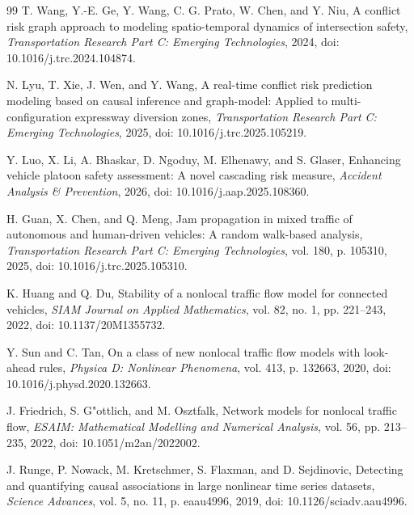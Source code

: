 \documentclass[UTF8,zihao=5,a4paper]{ctexart}
\begin{document}
\begingroup
\footnotesize
\begin{thebibliography}{99}
T. Wang, Y.-E. Ge, Y. Wang, C. G. Prato, W. Chen, and Y. Niu,
A conflict risk graph approach to modeling spatio-temporal dynamics of intersection safety,
\emph{Transportation Research Part C: Emerging Technologies}, 2024,
doi: 10.1016/j.trc.2024.104874.

N. Lyu, T. Xie, J. Wen, and Y. Wang,
A real-time conflict risk prediction modeling based on causal inference and graph-model: Applied to multi-configuration expressway diversion zones,
\emph{Transportation Research Part C: Emerging Technologies}, 2025,
doi: 10.1016/j.trc.2025.105219.

Y. Luo, X. Li, A. Bhaskar, D. Ngoduy, M. Elhenawy, and S. Glaser,
Enhancing vehicle platoon safety assessment: A novel cascading risk measure,
\emph{Accident Analysis \& Prevention}, 2026,
doi: 10.1016/j.aap.2025.108360.

H. Guan, X. Chen, and Q. Meng,
Jam propagation in mixed traffic of autonomous and human-driven vehicles: A random walk-based analysis,
\emph{Transportation Research Part C: Emerging Technologies}, vol. 180, p. 105310, 2025,
doi: 10.1016/j.trc.2025.105310.

K. Huang and Q. Du,
Stability of a nonlocal traffic flow model for connected vehicles,
\emph{SIAM Journal on Applied Mathematics}, vol. 82, no. 1, pp. 221--243, 2022,
doi: 10.1137/20M1355732.

Y. Sun and C. Tan,
On a class of new nonlocal traffic flow models with look-ahead rules,
\emph{Physica D: Nonlinear Phenomena}, vol. 413, p. 132663, 2020,
doi: 10.1016/j.physd.2020.132663.

J. Friedrich, S. G{"o}ttlich, and M. Osztfalk,
Network models for nonlocal traffic flow,
\emph{ESAIM: Mathematical Modelling and Numerical Analysis}, vol. 56, pp. 213--235, 2022,
doi: 10.1051/m2an/2022002.

J. Runge, P. Nowack, M. Kretschmer, S. Flaxman, and D. Sejdinovic,
Detecting and quantifying causal associations in large nonlinear time series datasets,
\emph{Science Advances}, vol. 5, no. 11, p. eaau4996, 2019,
doi: 10.1126/sciadv.aau4996.
\end{thebibliography}
\endgroup
\end{document}

